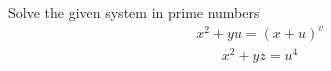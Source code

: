 Solve the given system in prime numbers
\begin{align*} x^2+yu = (x+u)^v \end{align*}\begin{align*} x^2+yz=u^4 \end{align*}